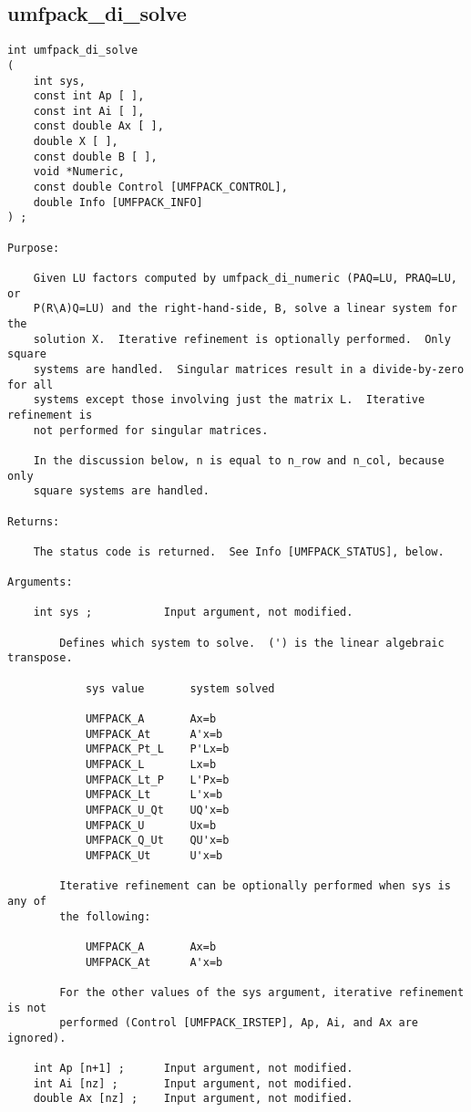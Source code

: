 \documentclass[11pt]{article}
\begin{document}
\subsection{umfpack\_di\_solve}

{\footnotesize
\begin{verbatim}
int umfpack_di_solve
(
    int sys,
    const int Ap [ ],
    const int Ai [ ],
    const double Ax [ ],
    double X [ ],
    const double B [ ],
    void *Numeric,
    const double Control [UMFPACK_CONTROL],
    double Info [UMFPACK_INFO]
) ;

Purpose:

    Given LU factors computed by umfpack_di_numeric (PAQ=LU, PRAQ=LU, or
    P(R\A)Q=LU) and the right-hand-side, B, solve a linear system for the
    solution X.  Iterative refinement is optionally performed.  Only square
    systems are handled.  Singular matrices result in a divide-by-zero for all
    systems except those involving just the matrix L.  Iterative refinement is
    not performed for singular matrices.

    In the discussion below, n is equal to n_row and n_col, because only
    square systems are handled.

Returns:

    The status code is returned.  See Info [UMFPACK_STATUS], below.

Arguments:

    int sys ;           Input argument, not modified.

        Defines which system to solve.  (') is the linear algebraic transpose.

            sys value       system solved

            UMFPACK_A       Ax=b
            UMFPACK_At      A'x=b
            UMFPACK_Pt_L    P'Lx=b
            UMFPACK_L       Lx=b
            UMFPACK_Lt_P    L'Px=b
            UMFPACK_Lt      L'x=b
            UMFPACK_U_Qt    UQ'x=b
            UMFPACK_U       Ux=b
            UMFPACK_Q_Ut    QU'x=b
            UMFPACK_Ut      U'x=b

        Iterative refinement can be optionally performed when sys is any of
        the following:

            UMFPACK_A       Ax=b
            UMFPACK_At      A'x=b

        For the other values of the sys argument, iterative refinement is not
        performed (Control [UMFPACK_IRSTEP], Ap, Ai, and Ax are ignored).

    int Ap [n+1] ;      Input argument, not modified.
    int Ai [nz] ;       Input argument, not modified.
    double Ax [nz] ;    Input argument, not modified.


\end{verbatim}}
\end{document}
